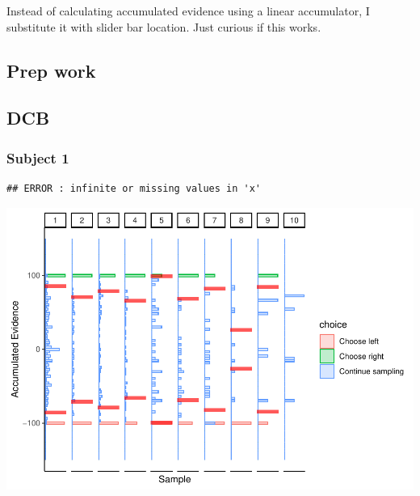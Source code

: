 \documentclass[
]{book}
\newenvironment{Shaded}{\begin{snugshade}}{\end{snugshade}}
\newcommand{\NormalTok}[1]{#1}
\newcommand{\OtherTok}[1]{\textcolor[rgb]{0.56,0.35,0.01}{#1}}
\newcommand{\SpecialCharTok}[1]{\textcolor[rgb]{0.81,0.36,0.00}{\textbf{#1}}}
\begin{document}
Instead of calculating accumulated evidence using a linear accumulator, I substitute it with slider bar location. Just curious if this works.

\hypertarget{prep-work-1}{%
\subsection{Prep work}\label{prep-work-1}}

\begin{Shaded}
\end{Shaded}

\hypertarget{dcb-3}{%
\subsection{DCB}\label{dcb-3}}

\hypertarget{subject-1-1}{%
\subsubsection*{Subject 1}\label{subject-1-1}}

\begin{verbatim}
## ERROR : infinite or missing values in 'x'
\end{verbatim}

\includegraphics{LateNightBayes_files/figure-latex/unnamed-chunk-23-1.pdf}
\end{document}
